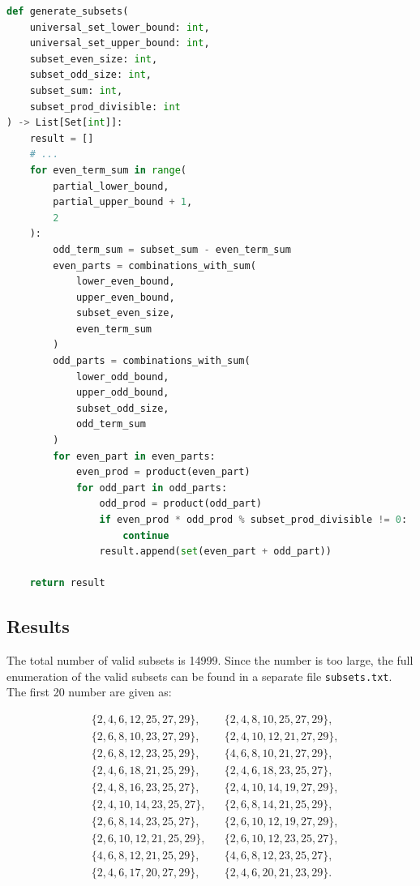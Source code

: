 \documentclass[11pt,a4paper]{article}
\begin{document}
\begin{lstlisting}[language=python]
def generate_subsets(
    universal_set_lower_bound: int,
    universal_set_upper_bound: int,
    subset_even_size: int,
    subset_odd_size: int,
    subset_sum: int,
    subset_prod_divisible: int
) -> List[Set[int]]:
    result = []
    # ...
    for even_term_sum in range(
        partial_lower_bound,
        partial_upper_bound + 1,
        2
    ):
        odd_term_sum = subset_sum - even_term_sum
        even_parts = combinations_with_sum(
            lower_even_bound,
            upper_even_bound,
            subset_even_size,
            even_term_sum
        )
        odd_parts = combinations_with_sum(
            lower_odd_bound,
            upper_odd_bound,
            subset_odd_size,
            odd_term_sum
        )
        for even_part in even_parts:
            even_prod = product(even_part)
            for odd_part in odd_parts:
                odd_prod = product(odd_part)
                if even_prod * odd_prod % subset_prod_divisible != 0:
                    continue
                result.append(set(even_part + odd_part))
    
    return result
\end{lstlisting}

\subsection*{Results}

The total number of valid subsets is 14999. Since the number is too large, the full enumeration of the valid subsets can be found in a separate file \texttt{subsets.txt}. The first 20 number are given as:

\[
\begin{aligned}
&\{2,4,6,12,25,27,29\}, && \{2,4,8,10,25,27,29\},\\
&\{2,6,8,10,23,27,29\}, && \{2,4,10,12,21,27,29\},\\
&\{2,6,8,12,23,25,29\}, && \{4,6,8,10,21,27,29\},\\
&\{2,4,6,18,21,25,29\}, && \{2,4,6,18,23,25,27\},\\
&\{2,4,8,16,23,25,27\}, && \{2,4,10,14,19,27,29\},\\
&\{2,4,10,14,23,25,27\}, && \{2,6,8,14,21,25,29\},\\
&\{2,6,8,14,23,25,27\}, && \{2,6,10,12,19,27,29\},\\
&\{2,6,10,12,21,25,29\}, && \{2,6,10,12,23,25,27\},\\
&\{4,6,8,12,21,25,29\}, && \{4,6,8,12,23,25,27\},\\
&\{2,4,6,17,20,27,29\}, && \{2,4,6,20,21,23,29\}.
\end{aligned}
\]
\end{document}

